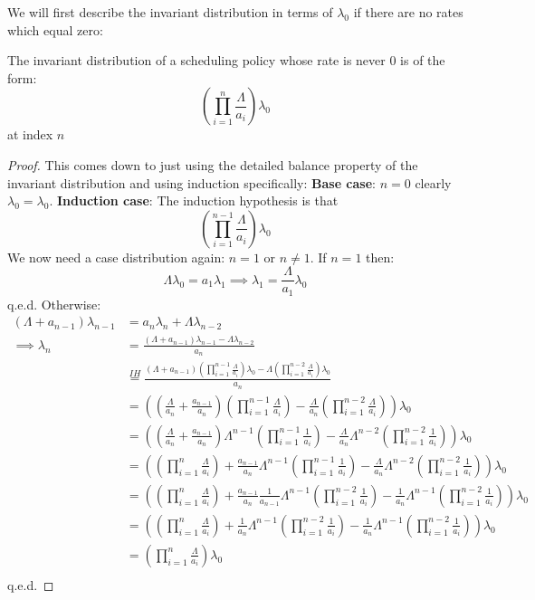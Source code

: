 We will first describe the invariant distribution in terms of $\lambda_0$ if there are no rates which equal zero:
\begin{lemma}\label{lem:InvariantDistributionValue}\leanok
  The invariant distribution of a scheduling policy whose rate is never $0$ is of the form:
  $$\left(\prod_{i=1}^{n} \frac{\Lambda}{a_i}\right)\lambda_0$$
  at index $n$
\end{lemma}

\begin{proof}\leanok
  This comes down to just using the detailed balance property of the invariant distribution and using induction
  specifically:
  \textbf{Base case}: $n = 0$ clearly $\lambda_0 = \lambda_0$.
  \textbf{Induction case}:
  The induction hypothesis is that $$\left(\prod_{i=1}^{n-1} \frac{\Lambda}{a_i}\right)\lambda_0$$
  We now need a case distribution again:
  $n = 1$ or $n \neq 1$.
  If $n = 1$ then:
    $$\Lambda \lambda_0 = a_1 \lambda_1 \implies \lambda_1 = \frac{\Lambda}{a_1} \lambda_0$$ q.e.d.
  Otherwise:
  \begin{align*}
    (\Lambda + a_{n-1})\lambda_{n-1} &= a_n \lambda_n + \Lambda \lambda_{n-2}\\
    \implies \lambda_n &= \frac{(\Lambda + a_{n-1})\lambda_{n-1} - \Lambda \lambda_{n-2}}{a_n}\\
    &\overset{IH}{=} \frac{(\Lambda + a_{n-1})\left(\prod_{i=1}^{n-1} \frac{\Lambda}{a_i}\right)\lambda_0 -
    \Lambda \left(\prod_{i=1}^{n-2} \frac{\Lambda}{a_i}\right)\lambda_0}{a_n}\\
    &= \left({(\frac{\Lambda}{a_n} + \frac{a_{n-1}}{a_n})\left(\prod_{i=1}^{n-1} \frac{\Lambda}{a_i}\right) -
    \frac{\Lambda}{a_n} \left(\prod_{i=1}^{n-2} \frac{\Lambda}{a_i}\right)}\right)\lambda_0\\
    &= \left({(\frac{\Lambda}{a_n} + \frac{a_{n-1}}{a_n})\Lambda^{n-1}\left(\prod_{i=1}^{n-1} \frac{1}{a_i}\right) -
    \frac{\Lambda}{a_n} \Lambda^{n-2 }\left(\prod_{i=1}^{n-2} \frac{1}{a_i}\right)}\right)\lambda_0\\
    &= \left({\left(\prod_{i=1}^{n} \frac{\Lambda}{a_i}\right) + \frac{a_{n-1}}{a_n}\Lambda^{n-1}\left(\prod_{i=1}^{n-1} \frac{1}{a_i}\right) -
    \frac{\Lambda}{a_n} \Lambda^{n-2 }\left(\prod_{i=1}^{n-2} \frac{1}{a_i}\right)}\right)\lambda_0\\
    &= \left({\left(\prod_{i=1}^{n} \frac{\Lambda}{a_i}\right) + \frac{a_{n-1}}{a_n} \frac{1}{a_{n-1}}\Lambda^{n-1}\left(\prod_{i=1}^{n-2} \frac{1}{a_i}\right) -
    \frac{1}{a_n} \Lambda^{n-1}\left(\prod_{i=1}^{n-2} \frac{1}{a_i}\right)}\right)\lambda_0\\
    &= \left({\left(\prod_{i=1}^{n} \frac{\Lambda}{a_i}\right) + \frac{1}{a_n}\Lambda^{n-1}\left(\prod_{i=1}^{n-2} \frac{1}{a_i}\right) -
    \frac{1}{a_n} \Lambda^{n-1}\left(\prod_{i=1}^{n-2} \frac{1}{a_i}\right)}\right)\lambda_0\\
    &= \left(\prod_{i=1}^{n} \frac{\Lambda}{a_i}\right)\lambda_0\\
  \end{align*}
  q.e.d.
\end{proof}


